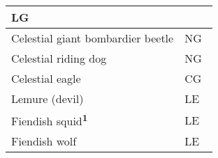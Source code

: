 \begin{longtable}{llll}
{\begin{minipage}[t]{0.601in}
LG\end{minipage}}\\
\hline
\multicolumn{1}{|p{3.326in}|}{\begin{minipage}[t]{3.326in}\raggedright
Celestial giant bombardier beetle\end{minipage}} & \multicolumn{3}{p{0.601in}|}{\begin{minipage}[t]{0.601in}\raggedright
NG\end{minipage}}\\
\hline
\multicolumn{1}{|p{3.326in}|}{\begin{minipage}[t]{3.326in}\raggedright
Celestial riding dog\end{minipage}} & \multicolumn{3}{p{0.601in}|}{\begin{minipage}[t]{0.601in}\raggedright
NG\end{minipage}}\\
\hline
\multicolumn{1}{|p{3.326in}|}{\begin{minipage}[t]{3.326in}\raggedright
Celestial eagle\end{minipage}} & \multicolumn{3}{p{0.601in}|}{\begin{minipage}[t]{0.601in}\raggedright
CG\end{minipage}}\\
\hline
\multicolumn{1}{|p{3.326in}|}{\begin{minipage}[t]{3.326in}\raggedright
Lemure (devil)\end{minipage}} & \multicolumn{3}{p{0.601in}|}{\begin{minipage}[t]{0.601in}\raggedright
LE\end{minipage}}\\
\hline
\multicolumn{1}{|p{3.326in}|}{\begin{minipage}[t]{3.326in}\raggedright
Fiendish squid\textsuperscript{\textbf{1}}\end{minipage}} & \multicolumn{3}{p{0.601in}|}{\begin{minipage}[t]{0.601in}\raggedright
LE\end{minipage}}\\
\hline
\multicolumn{1}{|p{3.326in}|}{\begin{minipage}[t]{3.326in}\raggedright
Fiendish wolf\end{minipage}} & \multicolumn{3}{p{0.601in}|}{\begin{minipage}[t]{0.601in}\raggedright
LE\end{minipage}}\\

\end{longtable}

